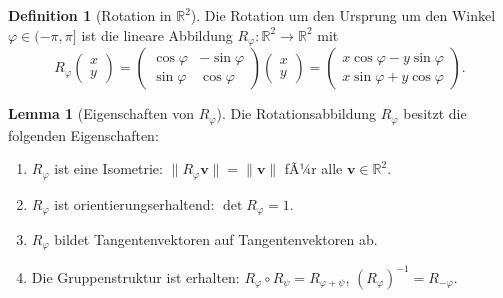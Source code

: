 ﻿\documentclass[12pt, a4paper]{article}
\theoremstyle{definition}
\newtheorem{definition}{Definition}[section]
\newtheorem{lemma}{Lemma}[section]
\begin{document}
	\begin{definition}[Rotation in $\mathbb{R}^2$]
		Die Rotation um den Ursprung um den Winkel $\varphi \in (-\pi, \pi]$ ist die
		lineare Abbildung $R_\varphi: \mathbb{R}^2 \to \mathbb{R}^2$ mit
		\[
		R_\varphi \begin{pmatrix} x \\ y \end{pmatrix}
		= \begin{pmatrix} \cos\varphi & -\sin\varphi \\ \sin\varphi & \cos\varphi \end{pmatrix}
		\begin{pmatrix} x \\ y \end{pmatrix}
		= \begin{pmatrix} x\cos\varphi - y\sin\varphi \\ x\sin\varphi + y\cos\varphi \end{pmatrix}.
		\]
	\end{definition}
	
	\begin{lemma}[Eigenschaften von $R_\varphi$]\label{lem:rotation}
		Die Rotationsabbildung $R_\varphi$ besitzt die folgenden Eigenschaften:
		\begin{enumerate}[label=(\roman*)]
			\item $R_\varphi$ ist eine Isometrie: $\|R_\varphi \mathbf{v}\| = \|\mathbf{v}\|$
			fÃ¼r alle $\mathbf{v} \in \mathbb{R}^2$.
			\item $R_\varphi$ ist orientierungserhaltend: $\det R_\varphi = 1$.
			\item $R_\varphi$ bildet Tangentenvektoren auf Tangentenvektoren ab.
			\item Die Gruppenstruktur ist erhalten: $R_\varphi \circ R_\psi = R_{\varphi+\psi}$,
			$(R_\varphi)^{-1} = R_{-\varphi}$.
		\end{enumerate}
	\end{lemma}
	
\end{document}
